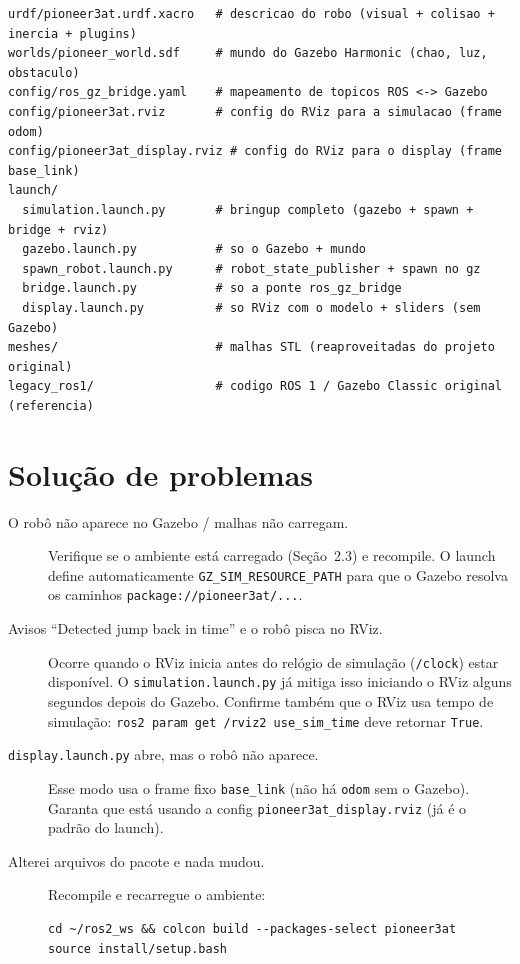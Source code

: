 \documentclass[11pt,a4paper]{article}
\begin{document}
\begin{lstlisting}
urdf/pioneer3at.urdf.xacro   # descricao do robo (visual + colisao + inercia + plugins)
worlds/pioneer_world.sdf     # mundo do Gazebo Harmonic (chao, luz, obstaculo)
config/ros_gz_bridge.yaml    # mapeamento de topicos ROS <-> Gazebo
config/pioneer3at.rviz       # config do RViz para a simulacao (frame odom)
config/pioneer3at_display.rviz # config do RViz para o display (frame base_link)
launch/
  simulation.launch.py       # bringup completo (gazebo + spawn + bridge + rviz)
  gazebo.launch.py           # so o Gazebo + mundo
  spawn_robot.launch.py      # robot_state_publisher + spawn no gz
  bridge.launch.py           # so a ponte ros_gz_bridge
  display.launch.py          # so RViz com o modelo + sliders (sem Gazebo)
meshes/                      # malhas STL (reaproveitadas do projeto original)
legacy_ros1/                 # codigo ROS 1 / Gazebo Classic original (referencia)
\end{lstlisting}

\section{Solução de problemas}

\begin{description}
  \item[O robô não aparece no Gazebo / malhas não carregam.]
  Verifique se o ambiente está carregado (Seção~2.3) e recompile. O launch
  define automaticamente \texttt{GZ\_SIM\_RESOURCE\_PATH} para que o Gazebo
  resolva os caminhos \texttt{package://pioneer3at/...}.

  \item[Avisos ``Detected jump back in time'' e o robô pisca no RViz.]
  Ocorre quando o RViz inicia antes do relógio de simulação (\texttt{/clock})
  estar disponível. O \texttt{simulation.launch.py} já mitiga isso iniciando o
  RViz alguns segundos depois do Gazebo. Confirme também que o RViz usa tempo de
  simulação: \texttt{ros2 param get /rviz2 use\_sim\_time} deve retornar
  \texttt{True}.

  \item[\texttt{display.launch.py} abre, mas o robô não aparece.]
  Esse modo usa o frame fixo \texttt{base\_link} (não há \texttt{odom} sem o
  Gazebo). Garanta que está usando a config \texttt{pioneer3at\_display.rviz}
  (já é o padrão do launch).

  \item[Alterei arquivos do pacote e nada mudou.]
  Recompile e recarregue o ambiente:
  \begin{lstlisting}
cd ~/ros2_ws && colcon build --packages-select pioneer3at
source install/setup.bash
  \end{lstlisting}
\end{description}
\end{document}
